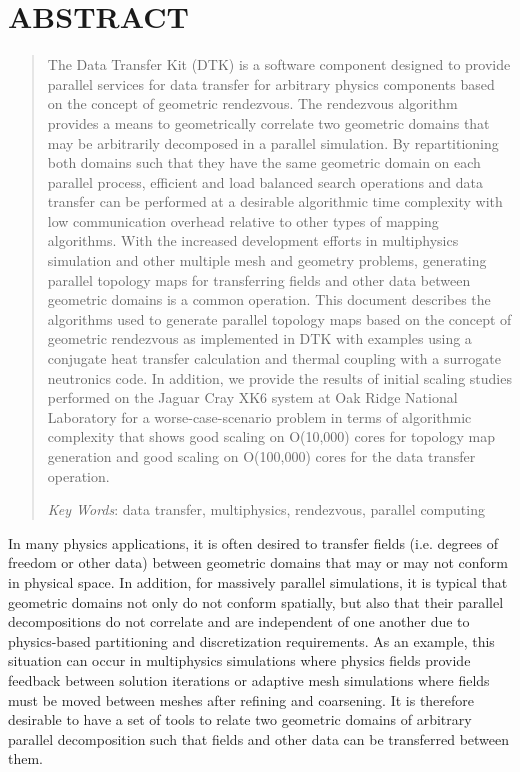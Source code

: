 \documentclass{mc2013}
\begin{document}
\section*{ABSTRACT} 
\begin{quote}
\begin{small}
The Data Transfer Kit (DTK) is a software component designed to
provide parallel services for data transfer for arbitrary physics
components based on the concept of geometric rendezvous. The
rendezvous algorithm provides a means to geometrically correlate two
geometric domains that may be arbitrarily decomposed in a parallel
simulation. By repartitioning both domains such that they have the
same geometric domain on each parallel process, efficient and load
balanced search operations and data transfer can be performed at a
desirable algorithmic time complexity with low communication overhead
relative to other types of mapping algorithms. With the increased
development efforts in multiphysics simulation and other multiple mesh
and geometry problems, generating parallel topology maps for
transferring fields and other data between geometric domains is a
common operation. This document describes the algorithms used to
generate parallel topology maps based on the concept of geometric
rendezvous as implemented in DTK with examples using a conjugate heat
transfer calculation and thermal coupling with a surrogate neutronics
code. In addition, we provide the results of initial scaling studies
performed on the Jaguar Cray XK6 system at Oak Ridge National
Laboratory for a worse-case-scenario problem in terms of algorithmic
complexity that shows good scaling on O(10,000) cores for topology map
generation and good scaling on O(100,000) cores for the data transfer
operation.


\emph{Key Words}: data transfer, multiphysics, rendezvous, parallel
computing
\end{small} 
\end{quote}

\setlength{\baselineskip}{14pt}
\normalsize

\label{sec:intro}

In many physics applications, it is often desired to transfer fields
(i.e. degrees of freedom or other data) between geometric domains that
may or may not conform in physical space. In addition, for massively
parallel simulations, it is typical that geometric domains not only do
not conform spatially, but also that their parallel decompositions do
not correlate and are independent of one another due to physics-based
partitioning and discretization requirements. As an example, this
situation can occur in multiphysics simulations where physics fields
provide feedback between solution iterations or adaptive mesh
simulations where fields must be moved between meshes after refining
and coarsening. It is therefore desirable to have a set of tools to
relate two geometric domains of arbitrary parallel decomposition such
that fields and other data can be transferred between them.
\end{document}
